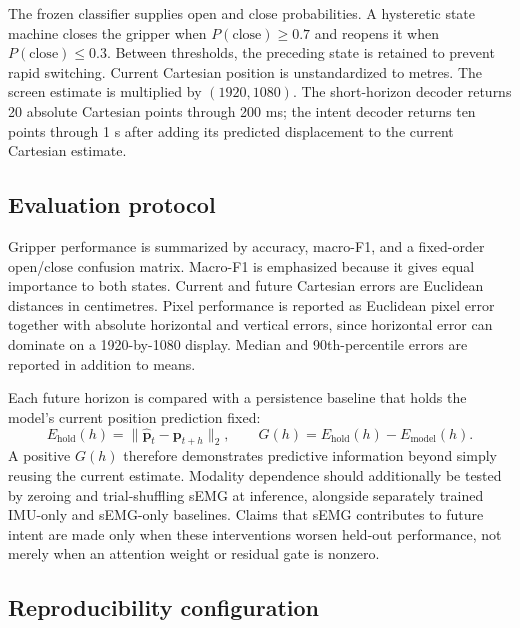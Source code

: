 The frozen classifier supplies open and close probabilities.  A hysteretic
state machine closes the gripper when $P(\mathrm{close})\geq0.7$ and reopens it
when $P(\mathrm{close})\leq0.3$.  Between thresholds, the preceding state is
retained to prevent rapid switching.  Current Cartesian position is
unstandardized to metres.  The screen estimate is multiplied by
$(1920,1080)$.  The short-horizon decoder returns 20 absolute Cartesian points
through 200 ms; the intent decoder returns ten points through 1 s after adding
its predicted displacement to the current Cartesian estimate.

\subsection{Evaluation protocol}

Gripper performance is summarized by accuracy, macro-F1, and a fixed-order
open/close confusion matrix.  Macro-F1 is emphasized because it gives equal
importance to both states.  Current and future Cartesian errors are Euclidean
distances in centimetres.  Pixel performance is reported as Euclidean pixel
error together with absolute horizontal and vertical errors, since horizontal
error can dominate on a 1920-by-1080 display.  Median and 90th-percentile errors
are reported in addition to means.

Each future horizon is compared with a persistence baseline that holds the
model's current position prediction fixed:
\begin{equation}
 E_{\mathrm{hold}}(h)=
 \|\hat{\mathbf{p}}_t-\mathbf{p}_{t+h}\|_2,
 \qquad
 G(h)=E_{\mathrm{hold}}(h)-E_{\mathrm{model}}(h).
\end{equation}
A positive $G(h)$ therefore demonstrates predictive information beyond simply
reusing the current estimate.  Modality dependence should additionally be
tested by zeroing and trial-shuffling sEMG at inference, alongside separately
trained IMU-only and sEMG-only baselines.  Claims that sEMG contributes to
future intent are made only when these interventions worsen held-out
performance, not merely when an attention weight or residual gate is nonzero.

\subsection{Reproducibility configuration}

